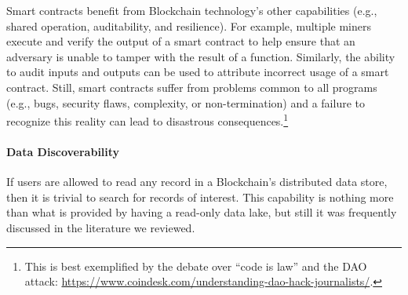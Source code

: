 Smart contracts benefit from Blockchain technology's other capabilities (e.g., shared operation, auditability, and resilience).
For example, multiple miners execute and verify the output of a smart contract to help ensure that an adversary is unable to tamper with the result of a function.
Similarly, the ability to audit inputs and outputs can be used to attribute incorrect usage of a smart contract.
Still, smart contracts suffer from problems common to all programs (e.g., bugs, security flaws, complexity, or non-termination) and a failure to recognize this reality can lead to disastrous consequences.\footnote{This is best exemplified by the debate over ``code is law'' and the DAO attack: \url{https://www.coindesk.com/understanding-dao-hack-journalists/}.}

\paragraph{Data Discoverability}
If users are allowed to read any record in a Blockchain's distributed data store, then it is trivial to search for records of interest.
This capability is nothing more than what is provided by having a read-only data lake, but still it was frequently discussed in the literature we reviewed.